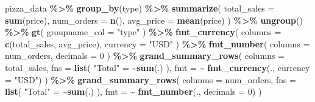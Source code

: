 \documentclass[
]{article}
\newenvironment{Shaded}{\begin{snugshade}}{\end{snugshade}}
\newcommand{\AttributeTok}[1]{\textcolor[rgb]{0.13,0.29,0.53}{#1}}
\newcommand{\DecValTok}[1]{\textcolor[rgb]{0.00,0.00,0.81}{#1}}
\newcommand{\ErrorTok}[1]{\textcolor[rgb]{0.64,0.00,0.00}{\textbf{#1}}}
\newcommand{\FunctionTok}[1]{\textcolor[rgb]{0.13,0.29,0.53}{\textbf{#1}}}
\newcommand{\NormalTok}[1]{#1}
\newcommand{\OtherTok}[1]{\textcolor[rgb]{0.56,0.35,0.01}{#1}}
\newcommand{\SpecialCharTok}[1]{\textcolor[rgb]{0.81,0.36,0.00}{\textbf{#1}}}
\newcommand{\StringTok}[1]{\textcolor[rgb]{0.31,0.60,0.02}{#1}}
\begin{document}
\begin{Shaded}
\begin{Highlighting}[]
\NormalTok{pizza\_data }\SpecialCharTok{\%\textgreater{}\%}
  \FunctionTok{group\_by}\NormalTok{(type) }\SpecialCharTok{\%\textgreater{}\%}
  \FunctionTok{summarize}\NormalTok{(}
    \AttributeTok{total\_sales =} \FunctionTok{sum}\NormalTok{(price),}
    \AttributeTok{num\_orders =} \FunctionTok{n}\NormalTok{(),}
    \AttributeTok{avg\_price =} \FunctionTok{mean}\NormalTok{(price)}
\NormalTok{  ) }\SpecialCharTok{\%\textgreater{}\%}
  \FunctionTok{ungroup}\NormalTok{() }\SpecialCharTok{\%\textgreater{}\%}
  \FunctionTok{gt}\NormalTok{(}
    \AttributeTok{groupname\_col =} \StringTok{"type"}
\NormalTok{  ) }\SpecialCharTok{\%\textgreater{}\%}
  \FunctionTok{fmt\_currency}\NormalTok{(}
    \AttributeTok{columns =} \FunctionTok{c}\NormalTok{(total\_sales, avg\_price),}
    \AttributeTok{currency =} \StringTok{"USD"}
\NormalTok{  ) }\SpecialCharTok{\%\textgreater{}\%}
  \FunctionTok{fmt\_number}\NormalTok{(}
    \AttributeTok{columns =}\NormalTok{ num\_orders,}
    \AttributeTok{decimals =} \DecValTok{0}
\NormalTok{  ) }\SpecialCharTok{\%\textgreater{}\%}
  \FunctionTok{grand\_summary\_rows}\NormalTok{(}
    \AttributeTok{columns =}\NormalTok{ total\_sales,}
    \AttributeTok{fns =} \FunctionTok{list}\NormalTok{(}
      \StringTok{"Total"} \OtherTok{=} \ErrorTok{\textasciitilde{}}\FunctionTok{sum}\NormalTok{(.)}
\NormalTok{    ),}
    \AttributeTok{fmt =} \SpecialCharTok{\textasciitilde{}} \FunctionTok{fmt\_currency}\NormalTok{(., }\AttributeTok{currency =} \StringTok{"USD"}\NormalTok{)  }
\NormalTok{  ) }\SpecialCharTok{\%\textgreater{}\%}
  \FunctionTok{grand\_summary\_rows}\NormalTok{(}
    \AttributeTok{columns =}\NormalTok{ num\_orders,}
    \AttributeTok{fns =} \FunctionTok{list}\NormalTok{(}
      \StringTok{"Total"} \OtherTok{=} \ErrorTok{\textasciitilde{}}\FunctionTok{sum}\NormalTok{(.)}
\NormalTok{    ),}
    \AttributeTok{fmt =} \SpecialCharTok{\textasciitilde{}} \FunctionTok{fmt\_number}\NormalTok{(., }\AttributeTok{decimals =} \DecValTok{0}\NormalTok{)  }
\NormalTok{  )}
\end{Highlighting}
\end{Shaded}
\end{document}
